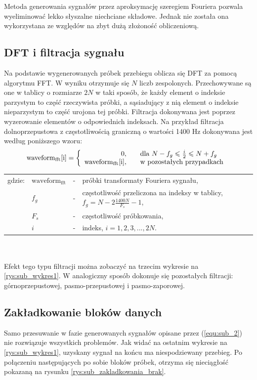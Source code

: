 Metoda generowania sygnałów przez aproksymację szeregiem Fouriera pozwala wyeliminować lekko słyszalne niechciane składowe. Jednak nie została ona wykorzystana ze względów na zbyt dużą złożoność obliczeniową. 

\subsection{DFT i filtracja sygnału}
Na podstawie wygenerowanych próbek przebiegu oblicza się DFT za pomocą algorytmu FFT. W wyniku otrzymuje się $N$ liczb zespolonych. Przechowywane są one w tablicy o rozmiarze $2N$ w taki sposób, że każdy element o indeksie parzystym to część rzeczywista próbki, a sąsiadujący z nią element o indeksie nieparzystym to część urojona tej próbki. Filtracja dokonywana jest poprzez wyzerowanie elementów o odpowiednich indeksach. Na przykład filtracja dolnoprzepustowa z częstotliwością graniczną o wartości 1400 Hz dokonywana jest według poniższego wzoru:
\begin{equation} \label{equ:sub_3}
\text{waveform}_{\text{fft}}\text{[i]}=\left \{\begin{array}{ r l }
0, & \quad  \text{dla } N - f_g \leqslant \frac{i}{2} \leqslant N + f_g \\
\text{waveform}_{\text{fft}}\text{[i]}, & \quad \text{w pozostałych przypadkach } 

\end{array}
\right.
\end{equation}
\begin{tabular}{ l l l l}
	gdzie: & $\text{waveform}_{\text{fft}}$ &  - & próbki transformaty Fouriera sygnału, \\
	&	$f_g$ & - &  częstotliwość przeliczona na indeksy w tablicy, $f_g = N - 2 \frac{1400N}{F_s} - 1$, \\
	&	$F_s$ & - & częstotliwość próbkowania,\\
	&	$i$ & - &  indeks, $i = 1, 2, 3, ..., 2N$.\\
\end{tabular} \\ \\

Efekt tego typu filtracji można zobaczyć na trzecim wykresie na \ref{rys:sub_wykres1}. W analogiczny sposób dokonuje się pozostałych filtracji: górnoprzepustowej, pasmo-przepustowej i pasmo-zaporowej.

\subsection{Zakładkowanie bloków danych}
Samo przesuwanie w fazie generowanych sygnałów opisane przez (\ref{equ:sub_2}) nie rozwiązuje wszystkich problemów. Jak widać na ostatnim wykresie na \ref{rys:sub_wykres1}, uzyskany sygnał na końcu ma niespodziewany przebieg. Po połączeniu następujących po sobie bloków próbek, otrzyma się nieciągłość pokazaną na rysunku \ref{rys:sub_zakladkowania_brak}.

